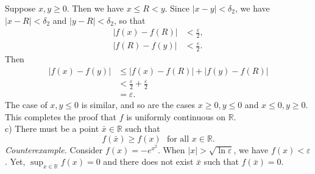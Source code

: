 \documentclass{article}
\begin{document}
Suppose $x, y \geq 0$. Then we have $x \leq R < y$. Since $|x-y|<\delta_2$, we have $|x-R|<\delta_2$ and $|y-R|<\delta_2$, so that
\begin{align*}
    |f(x)-f(R)|&<\frac{\varepsilon}{2},\\
    |f(R)-f(y)|&<\frac{\varepsilon}{2}.
\end{align*}
Then
\begin{align*}
    |f(x) - f(y)| &\leq |f(x) - f(R)| + |f(y) - f(R)| \\
    &< \frac{\varepsilon}{2} + \frac{\varepsilon}{2} \\
    &= \varepsilon.
\end{align*}
The case of $x,y\leq 0$ is similar, and so are the cases $x\geq 0, y\leq 0$ and $x\leq 0, y\geq 0$. This completes the proof that $f$ is uniformly continuous on $\mathbb{R}$. \\
\linebreak
c) There must be a point $\bar{x} \in \mathbb{R}$ such that 
$$ f(\bar{x}) \geq f(x) \ \ \ \text{for all $x \in \mathbb{R}$}. $$
\linebreak
\textit{Counterexample.} Consider $f(x) = -e^{x^2}$. When $|x| > \sqrt{\ln \varepsilon}$, we have $f(x) < \varepsilon$. Yet, $\sup_{x\in\mathbb{R}} f(x) = 0$ and there does not exist $\bar{x}$ such that $f(\bar{x}) = 0$.

\pagebreak
\end{document}
